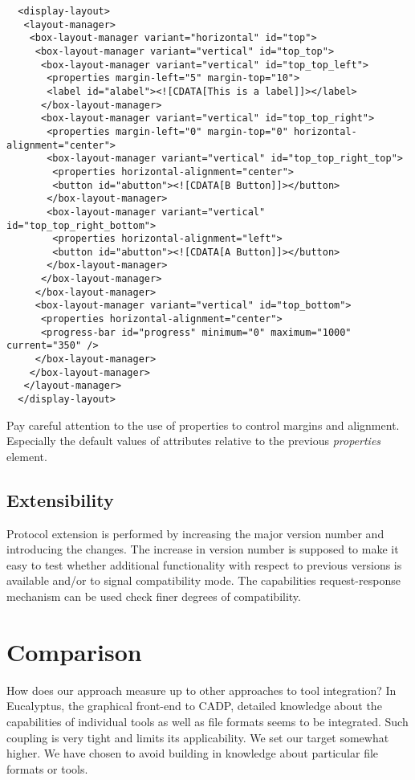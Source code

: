 \documentclass{article}
\begin{document}
   \small \begin{verbatim}
  <display-layout>
   <layout-manager>
    <box-layout-manager variant="horizontal" id="top">
     <box-layout-manager variant="vertical" id="top_top">
      <box-layout-manager variant="vertical" id="top_top_left">
       <properties margin-left="5" margin-top="10">
       <label id="alabel"><![CDATA[This is a label]]></label>
      </box-layout-manager>
      <box-layout-manager variant="vertical" id="top_top_right">
       <properties margin-left="0" margin-top="0" horizontal-alignment="center">
       <box-layout-manager variant="vertical" id="top_top_right_top">
        <properties horizontal-alignment="center">
        <button id="abutton"><![CDATA[B Button]]></button>
       </box-layout-manager>
       <box-layout-manager variant="vertical" id="top_top_right_bottom">
        <properties horizontal-alignment="left">
        <button id="abutton"><![CDATA[A Button]]></button>
       </box-layout-manager>
      </box-layout-manager>
     </box-layout-manager>
     <box-layout-manager variant="vertical" id="top_bottom">
      <properties horizontal-alignment="center">
      <progress-bar id="progress" minimum="0" maximum="1000" current="350" />
     </box-layout-manager>
    </box-layout-manager>
   </layout-manager>
  </display-layout>\end{verbatim}
  \normalsize

  \noindent Pay careful attention to the use of properties to control margins and
  alignment. Especially the default values of attributes relative to the
  previous \textit{properties} element.

  \subsection{Extensibility}

   Protocol extension is performed by increasing the major version number and
   introducing the changes. The increase in version number is supposed to make
   it easy to test whether additional functionality with respect to previous
   versions is available and/or to signal compatibility mode. The capabilities
   request-response mechanism can be used check finer degrees of compatibility.
   
  \section{Comparison}
  
   How does our approach measure up to other approaches to tool integration?  In
   Eucalyptus, the graphical front-end to CADP, detailed knowledge about the
   capabilities of individual tools as well as file formats seems to be
   integrated. Such coupling is very tight and limits its applicability. We set
   our target somewhat higher. We have chosen to avoid building in knowledge
   about particular file formats or tools.
   
\end{document}
